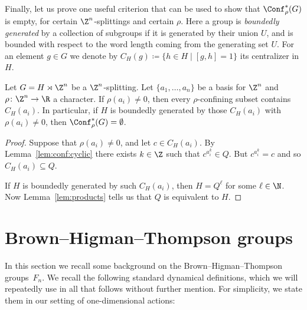 Finally, let us prove one useful criterion that can be used to show that $\Conf^\ast_\rho(G)$ is empty, for certain $\Z^n$-splittings and certain $\rho$. Here a group is \emph{boundedly generated} by a collection of subgroups if it is generated by their union $U$, and is bounded with respect to the word length coming from the generating set $U$. For an element $g \in G$ we denote by $C_H(g) \coloneqq \{ h \in H \mid [g, h] = 1 \}$ its centralizer in $H$.

\begin{prop}
\label{prop:empty_conf}
Let $G = H \rtimes \Z^n$ be a $\Z^n$-splitting. Let $\{a_1,\dots,a_n\}$ be a basis for $\Z^n$ and $\rho\colon \Z^n \to \R$ a character. If $\rho(a_i) \neq 0$, then every $\rho$-confining subset contains $C_H(a_i)$. In particular, if $H$ is boundedly generated by those $C_H(a_i)$ with $\rho(a_i)\ne 0$, then $\Conf^\ast_\rho(G)= \emptyset$.
\end{prop}

\begin{proof}
Suppose that $\rho(a_i) \neq 0$, and let $c\in C_H(a_i)$. By Lemma~\ref{lem:conf:cyclic} there exists $k \in \Z$ such that $c^{a_i^k} \in Q$. But $c^{a_i^k} = c$ and so $C_H(a_i) \subseteq Q$.

If $H$ is boundedly generated by such $C_H(a_i)$, then $H=Q^\ell$ for some $\ell\in\N$. Now Lemma~\ref{lem:products} tells us that $Q$ is equivalent to $H$.
\end{proof}

\section{Brown--Higman--Thompson groups}\label{sec:thompson}

In this section we recall some background on the Brown--Higman--Thompson groups~$F_n$. We recall the following standard dynamical definitions, which we will repeatedly use in all that follows without further mention. For simplicity, we state them in our setting of one-dimensional actions:

